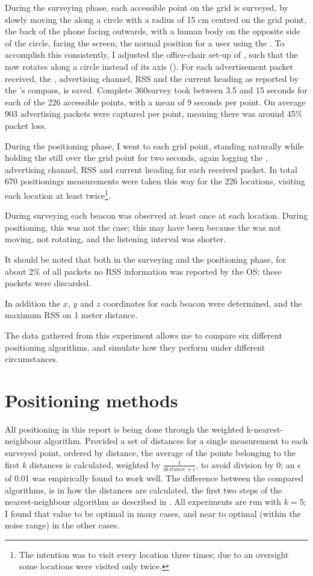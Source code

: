 During the surveying phase, each accessible point on the grid is surveyed, by slowly moving the \device along a circle with a radius of 15 cm centred on the grid point, the back of the phone facing outwards, with a human body on the opposite side of the circle, facing the screen; the normal position for a user using the \device.
To accomplish this consistently, I adjusted the office-chair set-up of , such that the \device now rotates along a circle instead of its axis ().
For each advertisement packet received, the \bid, advertising channel, RSS and the current heading as reported by the \device's compass, is saved.
Complete 360\tdegree survey took between 3.5 and 15 seconds for each of the 226 accessible points, with a mean of 9 seconds per point.
On average 903 advertising packets were captured per point, meaning there was around 45\% packet loss.

During the positioning phase, I went to each grid point, standing naturally while holding the \device still over the grid point for two seconds, again logging the \bid, advertising channel, RSS and current heading for each received packet.
In total 670 positionings measurements were taken this way for the 226 locations, visiting each location at least twice\footnote{The intention was to visit every location three times; due to an oversight some locations were visited only twice.}.

During surveying each beacon was observed at least once at each location.
During positioning, this was not the case; this may have been because the \device was not moving, not rotating, and the listening interval was shorter.

It should be noted that both in the surveying and the positioning phase, for about 2\% of all packets no RSS information was reported by the OS; these packets were discarded.

In addition the $x$, $y$ and $z$ coordinates for each beacon were determined, and the maximum RSS on 1 meter distance.

The data gathered from this experiment allows me to compare six different positioning algorithms, and simulate how they perform under different circumstances.

\section{Positioning methods}

All positioning in this report is being done through the weighted k-nearest-neighbour algorithm.
Provided a set of distances for a single measurement to each surveyed point, ordered by distance, the average of the points belonging to the first $k$ distances is calculated, weighted by $\frac{1}{distance+\epsilon}$, to avoid division by 0; an $\epsilon$ of 0.01 was empirically found to work well.
The difference between the compared algorithms, is in how the distances are calculated, the first two steps of the nearest-neighbour algorithm as described in .
All experiments are run with $k = 5$; I found that value to be optimal in many cases, and near to optimal (within the noise range) in the other cases.

